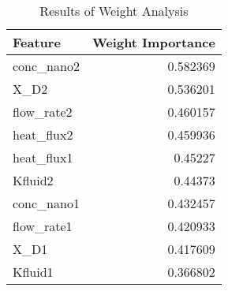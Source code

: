 
        \begin{table*}
            \centering
            \begin{tabular}{lr}
\hline
 Feature    &   Weight Importance \\
\hline
 conc_nano2 &            0.582369 \\
 X_D2       &            0.536201 \\
 flow_rate2 &            0.460157 \\
 heat_flux2 &            0.459936 \\
 heat_flux1 &            0.45227  \\
 Kfluid2    &            0.44373  \\
 conc_nano1 &            0.432457 \\
 flow_rate1 &            0.420933 \\
 X_D1       &            0.417609 \\
 Kfluid1    &            0.366802 \\
\hline
\end{tabular}
            \caption{Results of Weight Analysis}
            \label{table-weight_analysis}
        \end{table*}
        

